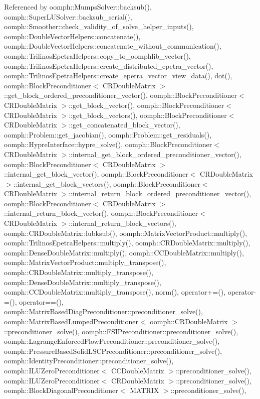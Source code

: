 Referenced by oomph\+::\+Mumps\+Solver\+::backsub(), oomph\+::\+Super\+L\+U\+Solver\+::backsub\+\_\+serial(), oomph\+::\+Smoother\+::check\+\_\+validity\+\_\+of\+\_\+solve\+\_\+helper\+\_\+inputs(), oomph\+::\+Double\+Vector\+Helpers\+::concatenate(), oomph\+::\+Double\+Vector\+Helpers\+::concatenate\+\_\+without\+\_\+communication(), oomph\+::\+Trilinos\+Epetra\+Helpers\+::copy\+\_\+to\+\_\+oomphlib\+\_\+vector(), oomph\+::\+Trilinos\+Epetra\+Helpers\+::create\+\_\+distributed\+\_\+epetra\+\_\+vector(), oomph\+::\+Trilinos\+Epetra\+Helpers\+::create\+\_\+epetra\+\_\+vector\+\_\+view\+\_\+data(), dot(), oomph\+::\+Block\+Preconditioner$<$ C\+R\+Double\+Matrix $>$\+::get\+\_\+block\+\_\+ordered\+\_\+preconditioner\+\_\+vector(), oomph\+::\+Block\+Preconditioner$<$ C\+R\+Double\+Matrix $>$\+::get\+\_\+block\+\_\+vector(), oomph\+::\+Block\+Preconditioner$<$ C\+R\+Double\+Matrix $>$\+::get\+\_\+block\+\_\+vectors(), oomph\+::\+Block\+Preconditioner$<$ C\+R\+Double\+Matrix $>$\+::get\+\_\+concatenated\+\_\+block\+\_\+vector(), oomph\+::\+Problem\+::get\+\_\+jacobian(), oomph\+::\+Problem\+::get\+\_\+residuals(), oomph\+::\+Hypre\+Interface\+::hypre\+\_\+solve(), oomph\+::\+Block\+Preconditioner$<$ C\+R\+Double\+Matrix $>$\+::internal\+\_\+get\+\_\+block\+\_\+ordered\+\_\+preconditioner\+\_\+vector(), oomph\+::\+Block\+Preconditioner$<$ C\+R\+Double\+Matrix $>$\+::internal\+\_\+get\+\_\+block\+\_\+vector(), oomph\+::\+Block\+Preconditioner$<$ C\+R\+Double\+Matrix $>$\+::internal\+\_\+get\+\_\+block\+\_\+vectors(), oomph\+::\+Block\+Preconditioner$<$ C\+R\+Double\+Matrix $>$\+::internal\+\_\+return\+\_\+block\+\_\+ordered\+\_\+preconditioner\+\_\+vector(), oomph\+::\+Block\+Preconditioner$<$ C\+R\+Double\+Matrix $>$\+::internal\+\_\+return\+\_\+block\+\_\+vector(), oomph\+::\+Block\+Preconditioner$<$ C\+R\+Double\+Matrix $>$\+::internal\+\_\+return\+\_\+block\+\_\+vectors(), oomph\+::\+C\+R\+Double\+Matrix\+::lubksub(), oomph\+::\+Matrix\+Vector\+Product\+::multiply(), oomph\+::\+Trilinos\+Epetra\+Helpers\+::multiply(), oomph\+::\+C\+R\+Double\+Matrix\+::multiply(), oomph\+::\+Dense\+Double\+Matrix\+::multiply(), oomph\+::\+C\+C\+Double\+Matrix\+::multiply(), oomph\+::\+Matrix\+Vector\+Product\+::multiply\+\_\+transpose(), oomph\+::\+C\+R\+Double\+Matrix\+::multiply\+\_\+transpose(), oomph\+::\+Dense\+Double\+Matrix\+::multiply\+\_\+transpose(), oomph\+::\+C\+C\+Double\+Matrix\+::multiply\+\_\+transpose(), norm(), operator+=(), operator-\/=(), operator==(), oomph\+::\+Matrix\+Based\+Diag\+Preconditioner\+::preconditioner\+\_\+solve(), oomph\+::\+Matrix\+Based\+Lumped\+Preconditioner$<$ oomph\+::\+C\+R\+Double\+Matrix $>$\+::preconditioner\+\_\+solve(), oomph\+::\+F\+S\+I\+Preconditioner\+::preconditioner\+\_\+solve(), oomph\+::\+Lagrange\+Enforced\+Flow\+Preconditioner\+::preconditioner\+\_\+solve(), oomph\+::\+Pressure\+Based\+Solid\+L\+S\+C\+Preconditioner\+::preconditioner\+\_\+solve(), oomph\+::\+Identity\+Preconditioner\+::preconditioner\+\_\+solve(), oomph\+::\+I\+L\+U\+Zero\+Preconditioner$<$ C\+C\+Double\+Matrix $>$\+::preconditioner\+\_\+solve(), oomph\+::\+I\+L\+U\+Zero\+Preconditioner$<$ C\+R\+Double\+Matrix $>$\+::preconditioner\+\_\+solve(), oomph\+::\+Block\+Diagonal\+Preconditioner$<$ M\+A\+T\+R\+I\+X $>$\+::preconditioner\+\_\+solve(), 